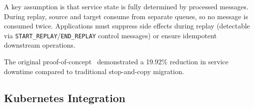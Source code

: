 \documentclass[conference]{IEEEtran}
\begin{document}
A key assumption is that service state is fully determined by processed
messages. During replay, source and target consume from separate queues, so no
message is consumed twice. Applications must suppress side effects during replay
(detectable via \texttt{START\_REPLAY}/\texttt{END\_REPLAY} control messages) or
ensure idempotent downstream operations.

The original proof-of-concept~\cite{dinhtuan2022ms2m} demonstrated a 19.92\%
reduction in service downtime compared to traditional stop-and-copy migration.

\subsection{Kubernetes Integration}
\label{sec:k8s-integration}
\end{document}
